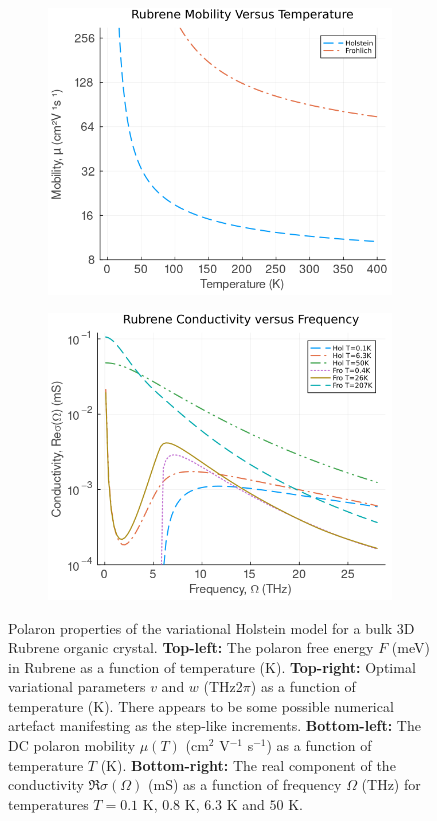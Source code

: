 \begin{figure}[!tbp]
  \begin{subfigure}[b]{0.49\textwidth}
    \centering
    \includegraphics[width=\textwidth]{figures/rubrene_mobility_temp_plot.png}
    \label{fig:rubrene_mobility_temp}
  \end{subfigure}
  \hfill
  \begin{subfigure}[b]{0.49\textwidth}
    \centering
    \includegraphics[width=\textwidth]{figures/rubrene_cond_freq.png}
    \label{fig:rubrene_cond_freq}
  \end{subfigure}
  \caption{Polaron properties of the variational Holstein model for a bulk 3D Rubrene organic crystal. \textbf{Top-left:} The polaron free energy $F$ (meV) in Rubrene as a function of temperature (K). \textbf{Top-right:} Optimal variational parameters $v$ and $w$ (THz2$\pi$) as a function of temperature (K). There appears to be some possible numerical artefact manifesting as the step-like increments. \textbf{Bottom-left:} The DC polaron mobility $\mu(T)$ (cm$^2$ V$^{-1}$ s$^{-1}$) as a function of temperature $T$ (K). \textbf{Bottom-right:} The real component of the conductivity $\Re\sigma(\Omega)$ (mS) as a function of frequency $\Omega$ (THz) for temperatures $T = 0.1$ K, $0.8$ K, $6.3$ K and $50$ K.}

\end{figure}
